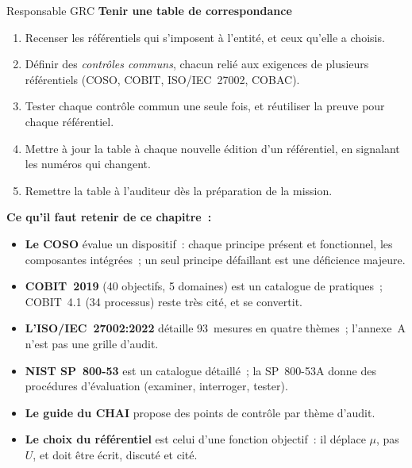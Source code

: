 \begin{boxmetier}{Responsable GRC}
\textbf{Tenir une table de correspondance}
\begin{enumerate}
    \item Recenser les référentiels qui s'imposent à l'entité, et ceux
          qu'elle a choisis.
    \item Définir des \emph{contrôles communs}, chacun relié aux exigences
          de plusieurs référentiels (COSO, COBIT, ISO/IEC~27002, COBAC).
    \item Tester chaque contrôle commun une seule fois, et réutiliser la
          preuve pour chaque référentiel.
    \item Mettre à jour la table à chaque nouvelle édition d'un
          référentiel, en signalant les numéros qui changent.
    \item Remettre la table à l'auditeur dès la préparation de la mission.
\end{enumerate}
\end{boxmetier}


\separateur

\begin{boxresume}
\textbf{Ce qu'il faut retenir de ce chapitre~:}
\begin{itemize}
    \item \textbf{Le COSO} évalue un dispositif~: chaque principe présent et
          fonctionnel, les composantes intégrées~; un seul principe
          défaillant est une déficience majeure.
    \item \textbf{COBIT~2019} (40 objectifs, 5 domaines) est un catalogue de
          pratiques~; COBIT~4.1 (34 processus) reste très cité, et se
          convertit.
    \item \textbf{L'ISO/IEC~27002:2022} détaille 93~mesures en quatre
          thèmes~; l'annexe~A n'est pas une grille d'audit.
    \item \textbf{NIST SP~800-53} est un catalogue détaillé~; la SP~800-53A
          donne des procédures d'évaluation (examiner, interroger, tester).
    \item \textbf{Le guide du CHAI} propose des points de contrôle par thème
          d'audit.
    \item \textbf{Le choix du référentiel} est celui d'une fonction
          objectif~: il déplace $\mu$, pas $U$, et doit être écrit, discuté
          et cité.
\end{itemize}
\end{boxresume}

